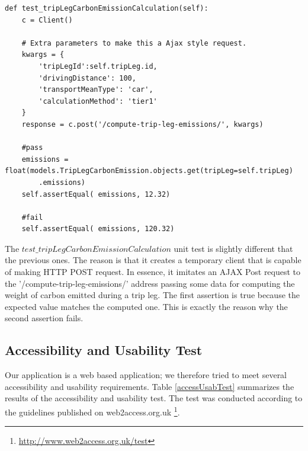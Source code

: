 \begin{verbatim}
def test_tripLegCarbonEmissionCalculation(self):
    c = Client()

    # Extra parameters to make this a Ajax style request.
    kwargs = {
        'tripLegId':self.tripLeg.id,
        'drivingDistance': 100,
        'transportMeanType': 'car',
        'calculationMethod': 'tier1'
    }
    response = c.post('/compute-trip-leg-emissions/', kwargs)

    #pass
    emissions = float(models.TripLegCarbonEmission.objects.get(tripLeg=self.tripLeg)
        .emissions)
    self.assertEqual( emissions, 12.32)

    #fail
    self.assertEqual( emissions, 120.32)
\end{verbatim}

The $test\_tripLegCarbonEmissionCalculation$ unit test is slightly different that the previous ones. The reason is that it creates a temporary client that is capable of making HTTP POST request. In essence, it imitates an AJAX Post request to the '/compute-trip-leg-emissions/' address passing some data for computing the weight of carbon emitted during a trip leg. The first assertion is true because the expected value matches the computed one. This is exactly the reason why the second assertion fails.


\subsection{Accessibility and Usability Test}

Our application is a web based application; we therefore tried to meet several accessibility and usability requirements. Table \ref{accessUsabTest} summarizes the results of the accessibility and usability test. The test was conducted according to the guidelines published on web2access.org.uk \footnote{\url{http://www.web2access.org.uk/test}}.

